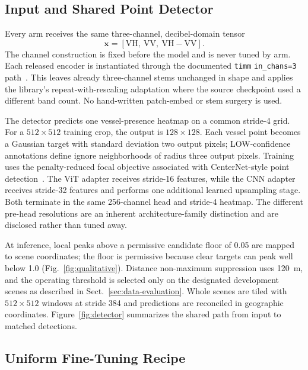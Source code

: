 \subsection{Input and Shared Point Detector}

Every arm receives the same three-channel, decibel-domain tensor
\begin{equation}
  \mathbf{x} = [\mathrm{VH},\ \mathrm{VV},\ \mathrm{VH}-\mathrm{VV}].
  \label{eq:channels}
\end{equation}
The channel construction is fixed before the model and is never tuned by arm.
Each released encoder is instantiated through the documented \texttt{timm}
\texttt{in\_chans=3} path~\cite{wightman2019timm}. This leaves already three-channel stems unchanged in
shape and applies the library's repeat-with-rescaling adaptation where the
source checkpoint used a different band count. No hand-written patch-embed or
stem surgery is used.

The detector predicts one vessel-presence heatmap on a common stride-4 grid.
For a $512\times512$ training crop, the output is $128\times128$. Each vessel
point becomes a Gaussian target with standard deviation two output pixels;
LOW-confidence annotations define ignore neighborhoods of radius three output
pixels. Training uses the penalty-reduced focal objective associated with
CenterNet-style point detection~\cite{lin2017focal,zhou2019objects}. The ViT
adapter receives stride-16 features, while the CNN adapter receives stride-32
features and performs one additional learned upsampling stage. Both terminate
in the same 256-channel head and stride-4 heatmap. The different pre-head
resolutions are an inherent architecture-family distinction and are disclosed
rather than tuned away.

At inference, local peaks above a permissive candidate floor of 0.05 are
mapped to scene coordinates; the floor is permissive because clear targets
can peak well below 1.0 (Fig.~\ref{fig:qualitative}). Distance non-maximum suppression uses 120~m, and
the operating threshold is selected only on the designated development
scenes as described in Sect.~\ref{sec:data-evaluation}. Whole scenes are tiled
with $512\times512$ windows at stride 384 and predictions are reconciled in
geographic coordinates. Figure~\ref{fig:detector} summarizes the shared path
from input to matched detections.



\subsection{Uniform Fine-Tuning Recipe}

